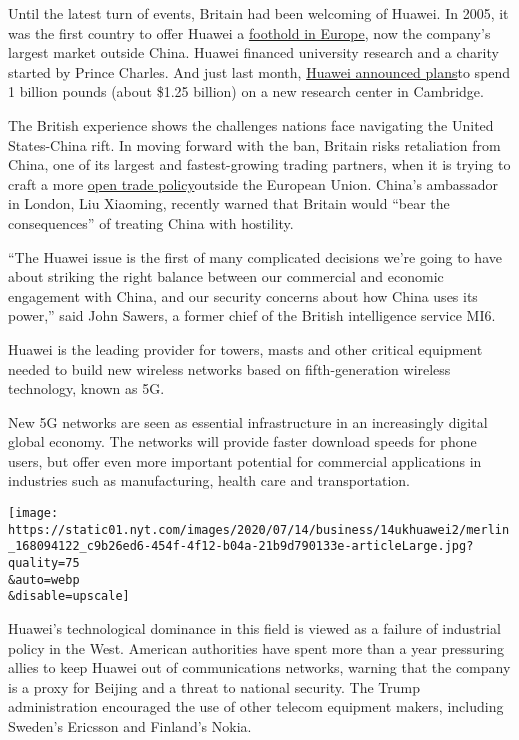 Until the latest turn of events, Britain had been welcoming of Huawei.
In 2005, it was the first country to offer Huawei a
\href{https://www.nytimes.com/2019/01/22/technology/huawei-europe-china.html}{foothold
in Europe}, now the company's largest market outside China. Huawei
financed university research and a charity started by Prince Charles.
And just last month,
\href{https://www.huawei.com/en/news/2020/6/huawei-optoelectronics-rd-manufacturing-centre-cambridge}{Huawei
announced plans}to spend 1 billion pounds (about \$1.25 billion) on a
new research center in Cambridge.

The British experience shows the challenges nations face navigating the
United States-China rift. In moving forward with the ban, Britain risks
retaliation from China, one of its largest and fastest-growing trading
partners, when it is trying to craft a more
\href{https://www.nytimes.com/2020/07/03/world/europe/johnson-brexit-hong-kong.html}{open
trade policy}outside the European Union. China's ambassador in London,
Liu Xiaoming, recently warned that Britain would ``bear the
consequences'' of treating China with hostility.

``The Huawei issue is the first of many complicated decisions we're
going to have about striking the right balance between our commercial
and economic engagement with China, and our security concerns about how
China uses its power,'' said John Sawers, a former chief of the British
intelligence service MI6.

Huawei is the leading provider for towers, masts and other critical
equipment needed to build new wireless networks based on
fifth-generation wireless technology, known as 5G.

New 5G networks are seen as essential infrastructure in an increasingly
digital global economy. The networks will provide faster download speeds
for phone users, but offer even more important potential for commercial
applications in industries such as manufacturing, health care and
transportation.

\texttt{[image: https://static01.nyt.com/images/2020/07/14/business/14ukhuawei2/merlin\_168094122\_c9b26ed6-454f-4f12-b04a-21b9d790133e-articleLarge.jpg?quality=75\\\&auto=webp\\\&disable=upscale]}

Huawei's technological dominance in this field is viewed as a failure of
industrial policy in the West. American authorities have spent more than
a year pressuring allies to keep Huawei out of communications networks,
warning that the company is a proxy for Beijing and a threat to national
security. The Trump administration encouraged the use of other telecom
equipment makers, including Sweden's Ericsson and Finland's Nokia.

